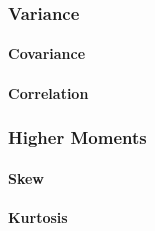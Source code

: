 

\subsubsection{Variance}


%

\paragraph{Covariance}

\paragraph{Correlation}





\subsubsection{Higher Moments}

\paragraph{Skew}

\paragraph{Kurtosis}





